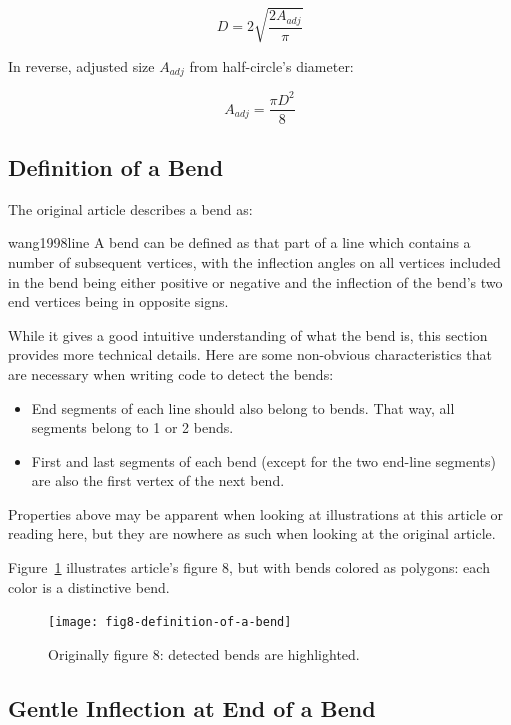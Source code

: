\documentclass[a4paper]{article}
\begin{document}
\[
  D = 2\sqrt{\frac{2 A_{adj}}{\pi}}
\]

In reverse, adjusted size $A_{adj}$ from half-circle's diameter:

\[
  A_{adj} = \frac{\pi D^2}{8}
\]

\subsection{Definition of a Bend}
\label{sec:definition-of-a-bend}

The original article describes a bend as:

\begin{displaycquote}{wang1998line}
    A bend can be defined as that part of a line which contains a number of
    subsequent vertices, with the inflection angles on all vertices included in
    the bend being either positive or negative and the inflection of the bend's
    two end vertices being in opposite signs.
\end{displaycquote}

While it gives a good intuitive understanding of what the bend is, this section
provides more technical details. Here are some non-obvious characteristics that
are necessary when writing code to detect the bends:

\begin{itemize}
    \item End segments of each line should also belong to bends. That way, all
        segments belong to 1 or 2 bends.

    \item First and last segments of each bend (except for the two end-line
        segments) are also the first vertex of the next bend.
\end{itemize}

Properties above may be apparent when looking at illustrations at this article
or reading here, but they are nowhere as such when looking at the original
article.

Figure~\ref{fig:fig8-definition-of-a-bend} illustrates article's figure 8,
but with bends colored as polygons: each color is a distinctive bend.

\begin{figure}[ht]
    \centering
    \texttt{[image: fig8-definition-of-a-bend]}
    \caption{Originally figure 8: detected bends are highlighted.}
    \label{fig:fig8-definition-of-a-bend}
\end{figure}

\subsection{Gentle Inflection at End of a Bend}
\end{document}
